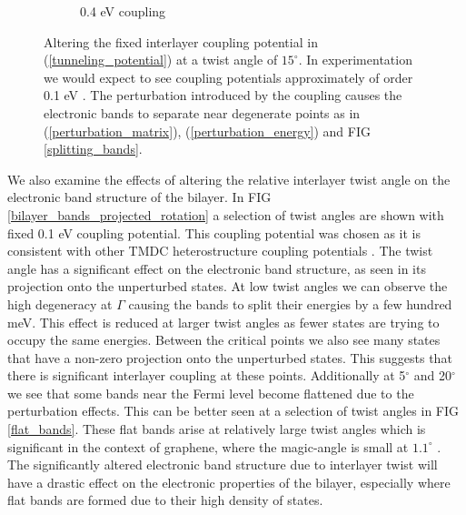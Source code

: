 \documentclass[12pt]{report} %
\begin{document}
\begin{figure}[th]
\begin{subfigure}[b]{0.475\textwidth}
    \caption{0.4 eV coupling}
    \label{bilayer_coupling_0.4}
  \end{subfigure}
  \caption{
    Altering the fixed interlayer coupling potential in (\ref{tunneling_potential}) at a twist angle of $15^\circ$. In experimentation we would expect to see coupling potentials approximately of order 0.1 eV \cite{Conte2019}. The perturbation introduced by the coupling causes the electronic bands to separate near degenerate points as in (\ref{perturbation_matrix}), (\ref{perturbation_energy}) and FIG \ref{splitting_bands}.
  }
  \label{bilayer_bands_projected_coupling}
\end{figure}

We also examine the effects of altering the relative interlayer twist angle on the electronic band structure of the bilayer. In FIG \ref{bilayer_bands_projected_rotation} a selection of twist angles are shown with fixed 0.1 eV coupling potential. This coupling potential was chosen as it is consistent with other TMDC heterostructure coupling potentials \cite{Conte2019}. The twist angle has a significant effect on the electronic band structure, as seen in its projection onto the unperturbed states. At low twist angles we can observe the high degeneracy at $\Gamma$ causing the bands to split their energies by a few hundred meV. This effect is reduced at larger twist angles as fewer states are trying to occupy the same energies. Between the critical points we also see many states that have a non-zero projection onto the unperturbed states. This suggests that there is significant interlayer coupling at these points. Additionally at 5$^\circ$ and 20$^\circ$ we see that some bands near the Fermi level become flattened due to the perturbation effects. This can be better seen at a selection of twist angles in FIG \ref{flat_bands}. These flat bands arise at relatively large twist angles which is significant in the context of graphene, where the magic-angle is small at $1.1^\circ$ \cite{Cao2018, Bistritzer2011}. The significantly altered electronic band structure due to interlayer twist will have a drastic effect on the electronic properties of the bilayer, especially where flat bands are formed due to their high density of states.
%
\end{document}
